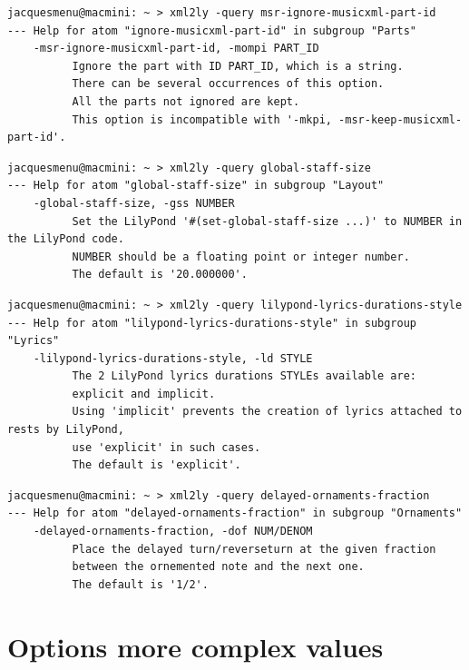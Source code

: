 \begin{lstlisting}[language=Terminal]
jacquesmenu@macmini: ~ > xml2ly -query msr-ignore-musicxml-part-id
--- Help for atom "ignore-musicxml-part-id" in subgroup "Parts"
    -msr-ignore-musicxml-part-id, -mompi PART_ID
          Ignore the part with ID PART_ID, which is a string.
          There can be several occurrences of this option.
          All the parts not ignored are kept.
          This option is incompatible with '-mkpi, -msr-keep-musicxml-part-id'.
\end{lstlisting}

\begin{lstlisting}[language=Terminal]
jacquesmenu@macmini: ~ > xml2ly -query global-staff-size
--- Help for atom "global-staff-size" in subgroup "Layout"
    -global-staff-size, -gss NUMBER
          Set the LilyPond '#(set-global-staff-size ...)' to NUMBER in the LilyPond code.
          NUMBER should be a floating point or integer number.
          The default is '20.000000'.
\end{lstlisting}

\begin{lstlisting}[language=Terminal]
jacquesmenu@macmini: ~ > xml2ly -query lilypond-lyrics-durations-style
--- Help for atom "lilypond-lyrics-durations-style" in subgroup "Lyrics"
    -lilypond-lyrics-durations-style, -ld STYLE
          The 2 LilyPond lyrics durations STYLEs available are:
          explicit and implicit.
          Using 'implicit' prevents the creation of lyrics attached to rests by LilyPond,
          use 'explicit' in such cases.
          The default is 'explicit'.
\end{lstlisting}

\begin{lstlisting}[language=Terminal]
jacquesmenu@macmini: ~ > xml2ly -query delayed-ornaments-fraction
--- Help for atom "delayed-ornaments-fraction" in subgroup "Ornaments"
    -delayed-ornaments-fraction, -dof NUM/DENOM
          Place the delayed turn/reverseturn at the given fraction
          between the ornemented note and the next one.
          The default is '1/2'.
\end{lstlisting}


\section{Options more complex values}\label{Options more complex values}

